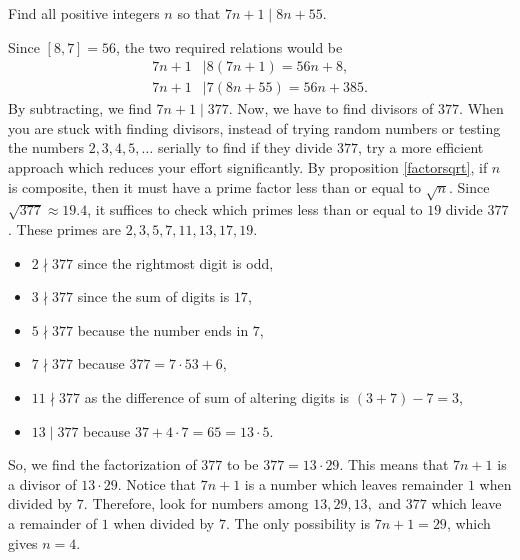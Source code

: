 \documentclass{subfile}
\begin{document}
		\begin{problem}
			Find all positive integers $n$ so that $7n+1\mid 8n+55$.
		\end{problem}

		\begin{solution}
			Since $[8,7]=56$, the two required relations would be
				\begin{align*}
					7n+1 & \mid 8(7n+1)=56n+8,\\
					7n+1 & \mid 7(8n+55)=56n+385.
				\end{align*}
			By subtracting, we find $7n+1\mid 377$. Now, we have to find divisors of $377$. When you are stuck with finding divisors, instead of trying random numbers or testing the numbers $2,3,4,5,\ldots$ serially to find if they divide $377$, try a more efficient approach which reduces your effort significantly. By proposition \eqref{factorsqrt}, if $n$ is composite, then it must have a prime factor less than or equal to $\sqrt{n}$.  Since $\sqrt{377} \approx 19.4$, it suffices to check which primes less than or equal to $19$ divide $377$. These primes are $2,3,5,7,11,13,17,19$.
				\begin{itemize}
					\item $2 \nmid 377$ since the rightmost digit is odd,
					\item $3 \nmid 377$ since the sum of digits is $17$,
					\item $5 \nmid 377$ because the number ends in $7$,
					\item $7 \nmid 377$ because $377=7\cdot53+6$,
					\item $11 \nmid 377$ as the difference of sum of altering digits is $(3+7)-7=3$,
					\item $13 \mid 377$ because $37 + 4 \cdot 7 = 65 = 13 \cdot 5$.
				\end{itemize}
			So, we find the factorization of $377$ to be $377=13 \cdot 29$. This means that $7n+1$ is a divisor of $13 \cdot 29$. Notice that $7n+1$ is a number which leaves remainder $1$ when divided by $7$. Therefore, look for numbers among $13, 29, 13, $ and $377$ which leave a remainder of $1$ when divided by $7$. The only possibility is $7n+1=29$, which gives $n=4$.
		\end{solution}
\end{document}
